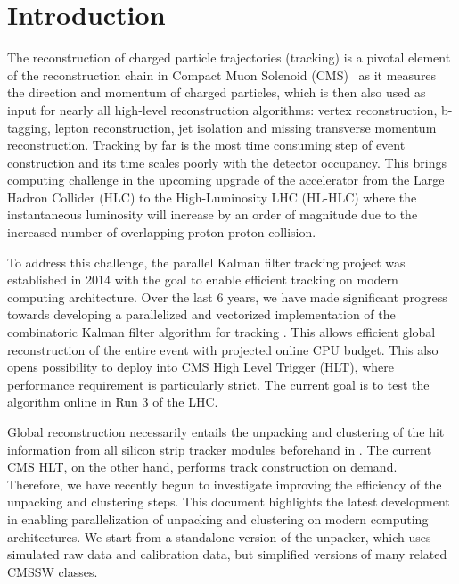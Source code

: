 \documentclass[10pt, paper=a4, UKenglish]{article}
\begin{document}
\normalsize 


\section{Introduction}
\label{intro}
The reconstruction of charged particle trajectories (tracking) is a pivotal element of the reconstruction chain in Compact Muon Solenoid (CMS)~\cite{Chatrchyan:2008aa} as it measures the direction and momentum of charged particles, which is then also used as input for nearly all high-level reconstruction algorithms: vertex reconstruction, b-tagging, lepton reconstruction, jet isolation and missing transverse momentum reconstruction. Tracking by far is the most time consuming step of event construction and its time scales poorly with the detector occupancy. This brings computing challenge in the upcoming upgrade of the accelerator from the Large Hadron Collider (HLC) to the High-Luminosity LHC (HL-HLC) where the instantaneous luminosity will increase by an order of magnitude due to the increased number of overlapping proton-proton collision.

To address this challenge, the parallel Kalman filter tracking project \mkFit was established in 2014 with the goal to enable efficient tracking on modern computing architecture. Over the last 6 years, we have made significant progress towards developing a parallelized and vectorized implementation of the combinatoric Kalman filter algorithm for tracking \cite{Cerati_2017,Cerati_2019,2019arXiv190611744C,2020arXiv200206295C}. This allows efficient global reconstruction of the entire event with projected online CPU budget. This also opens possibility to deploy \mkFit into CMS High Level Trigger (HLT), where performance requirement is particularly strict. The current goal is to test the algorithm online in Run 3 of the LHC. 

Global reconstruction necessarily entails the unpacking and clustering of the hit information from all silicon strip tracker modules beforehand in \mkFit. The current CMS HLT, on the other hand, performs track construction on demand. Therefore, we have recently begun to investigate improving the efficiency of the unpacking and clustering steps. This document highlights the latest development in enabling parallelization of unpacking and clustering on modern computing architectures. We start from a standalone version of the unpacker, which uses simulated raw data and calibration data, but simplified versions of many related CMSSW classes. 
\end{document}
